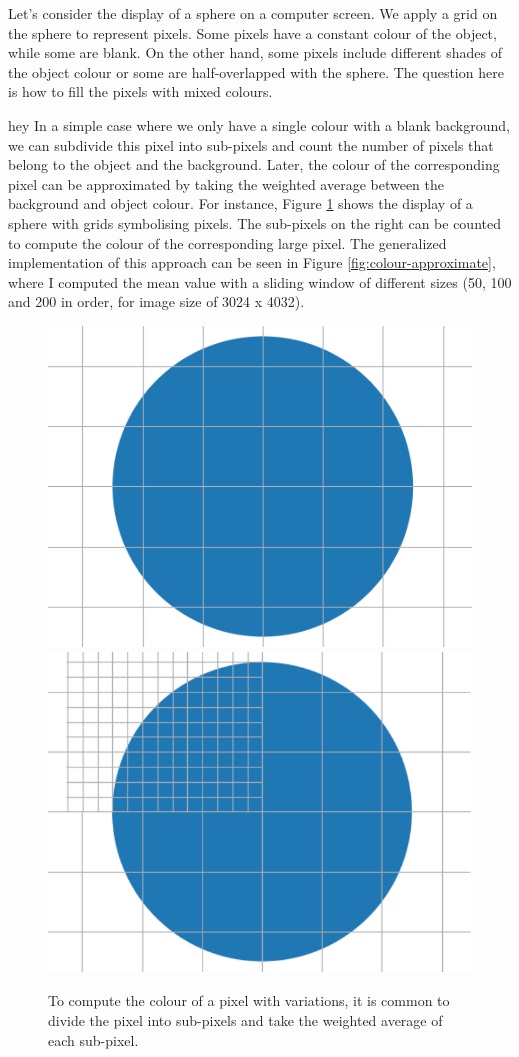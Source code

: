 Let's consider the display of a sphere on a computer screen. We apply a grid on the sphere to represent pixels. Some pixels have a constant colour of the object, while some are blank. On the other hand, some pixels include different shades of the object colour or some are half-overlapped with the sphere. The question here is how to fill the pixels with mixed colours. 

hey
In a simple case where we only have a single colour with a blank background, we can subdivide this pixel into sub-pixels and count the number of pixels that belong to the object and the background. Later, the colour of the corresponding pixel can be approximated by taking the weighted average between the background and object colour. For instance, Figure \ref{fig:display-grid} shows the display of a sphere with grids symbolising pixels. The sub-pixels on the right can be counted to compute the colour of the corresponding large pixel. The generalized implementation of this approach can be seen in Figure \ref{fig:colour-approximate}, where I computed the mean value with a sliding window of different sizes (50, 100 and 200 in order, for image size of 3024 x 4032).

\begin{figure}
  \centering
   \includegraphics[width=0.45\linewidth]{Images/grid_circle.png}
    \includegraphics[width=0.45\linewidth]{Images/merged_grid_circle2-crop.pdf}

   \caption{To compute the colour of a pixel with variations, it is common to divide the pixel into sub-pixels and take the weighted average of each sub-pixel.}
   \label{fig:display-grid}
\end{figure}


